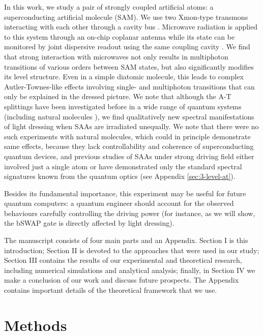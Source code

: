 \documentclass[%
 aps, prx,
 amsmath,amssymb,
 reprint,%
superscriptaddress
]{revtex4-2}
\begin{document}
In this work, we study a pair of strongly coupled 
artificial atoms: a superconducting artificial 
molecule \cite{kou2017fluxonium} (SAM). We use two 
Xmon-type \cite{barends2013coherent} 
transmons \cite{koch2007charge} interacting with 
each other through a cavity 
bus \cite{majer2007coupling}. Microwave radiation 
is applied to this system through an on-chip 
coplanar antenna while its state can be 
monitored by joint dispersive readout using the 
same coupling cavity \cite{chow2010detecting}. We 
find that strong interaction with microwaves not 
only results in multiphoton transitions of 
various orders between SAM states, but also 
significantly modifies its level structure. Even 
in a simple diatomic molecule, this leads to 
complex Autler-Townes-like effects involving 
single- and multiphoton  transitions that can 
only be explained in the dressed picture. We note 
that although the A-T splittings have been 
investigated before in a wide range of quantum 
systems (including natural 
molecules \cite{tamarat1995pump, 
ahmed2012autler}), we find qualitatively new 
spectral manifestations of light dressing when 
SAAs are irradiated unequally. We note that there 
were no such experiments with natural molecules, 
which could in principle demonstrate same 
effects, because they lack controllability and 
coherence of superconducting quantum devices, and 
previous studies of SAAs under strong driving field 
either involved just a single atom or have 
demonstrated only the standard spectral 
signatures known from the quantum optics (see 
Appendix \ref{sec:3-level-at}). 

Besides its fundamental importance, this 
experiment may be useful for future quantum 
computers: a quantum engineer should account for 
the observed behaviours carefully controlling the 
driving power (for instance, as we will show, the 
bSWAP gate \cite{poletto2012entanglement} is 
directly affected by light dressing).

The manuscript consists of four main parts and an 
Appendix. Section I is this introduction; Section 
II is devoted to the approaches that were used in 
our study; Section III contains the results of 
our experimental and theoretical research, 
including numerical simulations and analytical 
analysis; finally, in Section IV we make a 
conclusion of our work and discuss future 
prospects. The Appendix contains important 
details of the theoretical framework that we use.

\section{Methods}
\end{document}
